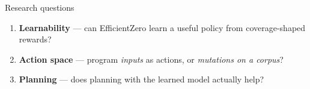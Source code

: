 \documentclass[aspectratio=169,10pt]{beamer}
\begin{document}
\begin{frame}{Research questions}
  \begin{enumerate}
    \item[\textbf{RQ1}] \textbf{Learnability} --- can EfficientZero learn a
      useful policy from coverage-shaped rewards?
    \bigskip
    \item[\textbf{RQ2}] \textbf{Action space} --- program \emph{inputs} as
      actions, or \emph{mutations on a corpus}?
    \bigskip
    \item[\textbf{RQ3}] \textbf{Planning} --- does planning with the learned
      model actually help?
  \end{enumerate}
\end{frame}
\end{document}
